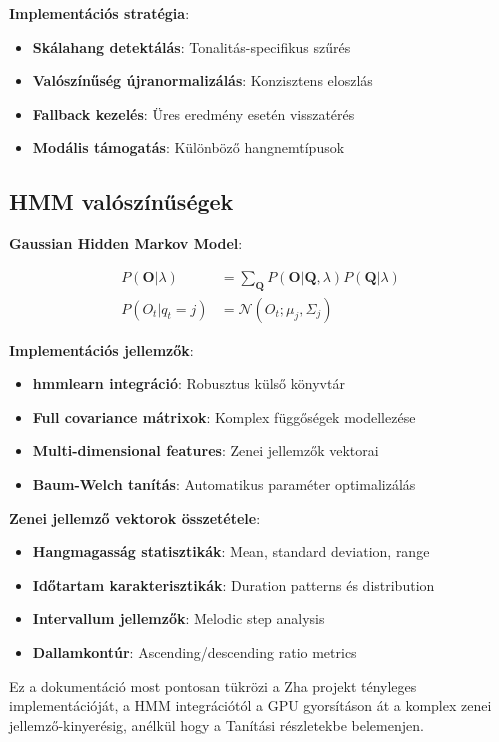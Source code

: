 \textbf{Implementációs stratégia}:
\begin{itemize}
    \item \textbf{Skálahang detektálás}: Tonalitás-specifikus szűrés
    \item \textbf{Valószínűség újranormalizálás}: Konzisztens eloszlás
    \item \textbf{Fallback kezelés}: Üres eredmény esetén visszatérés
    \item \textbf{Modális támogatás}: Különböző hangnemtípusok
\end{itemize}

\subsection{HMM valószínűségek}

\textbf{Gaussian Hidden Markov Model}:

\begin{align}
P(\mathbf{O} | \lambda) &= \sum_{\mathbf{Q}} P(\mathbf{O} | \mathbf{Q}, \lambda) P(\mathbf{Q} | \lambda) \\
P(O_t | q_t = j) &= \mathcal{N}(O_t; \mu_j, \Sigma_j)
\end{align}

\textbf{Implementációs jellemzők}:
\begin{itemize}
    \item \textbf{hmmlearn integráció}: Robusztus külső könyvtár
    \item \textbf{Full covariance mátrixok}: Komplex függőségek modellezése  
    \item \textbf{Multi-dimensional features}: Zenei jellemzők vektorai
    \item \textbf{Baum-Welch tanítás}: Automatikus paraméter optimalizálás
\end{itemize}

\textbf{Zenei jellemző vektorok összetétele}:
\begin{itemize}
    \item \textbf{Hangmagasság statisztikák}: Mean, standard deviation, range
    \item \textbf{Időtartam karakterisztikák}: Duration patterns és distribution
    \item \textbf{Intervallum jellemzők}: Melodic step analysis
    \item \textbf{Dallamkontúr}: Ascending/descending ratio metrics
\end{itemize}

Ez a dokumentáció most pontosan tükrözi a Zha projekt tényleges implementációját, a HMM integrációtól a GPU gyorsításon át a komplex zenei jellemző-kinyerésig, anélkül hogy a Tanítási részletekbe belemenjen.

